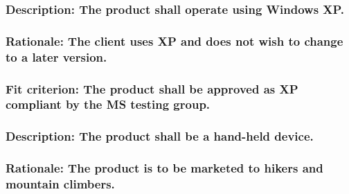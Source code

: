 \documentclass[
]{article}
\begin{document}
\hypertarget{description-the-product-shall-operate-using-windows-xp.}{%
\subsubsection{Description: The product shall operate using Windows
XP.}\label{description-the-product-shall-operate-using-windows-xp.}}

\hypertarget{rationale-the-client-uses-xp-and-does-not-wish-to-change-to-a-later-version.}{%
\subsubsection{\texorpdfstring{Rationale: The client uses XP and does
not wish to change to a later version.
}{Rationale: The client uses XP and does not wish to change to a later version. }}\label{rationale-the-client-uses-xp-and-does-not-wish-to-change-to-a-later-version.}}

\hypertarget{fit-criterion-the-product-shall-be-approved-as-xp-compliant-by-the-ms-testing-group.}{%
\subsubsection{\texorpdfstring{Fit criterion: The product shall be
approved as XP compliant by the MS testing group.
}{Fit criterion: The product shall be approved as XP compliant by the MS testing group. }}\label{fit-criterion-the-product-shall-be-approved-as-xp-compliant-by-the-ms-testing-group.}}

\hypertarget{section-4}{%
\subsubsection{\texorpdfstring{ }{ }}\label{section-4}}

\hypertarget{description-the-product-shall-be-a-hand-held-device.}{%
\subsubsection{Description: The product shall be a hand-held
device.}\label{description-the-product-shall-be-a-hand-held-device.}}

\hypertarget{rationale-the-product-is-to-be-marketed-to-hikers-and-mountain-climbers.}{%
\subsubsection{\texorpdfstring{Rationale: The product is to be marketed
to hikers and mountain climbers.
}{Rationale: The product is to be marketed to hikers and mountain climbers. }}\label{rationale-the-product-is-to-be-marketed-to-hikers-and-mountain-climbers.}}
\end{document}
